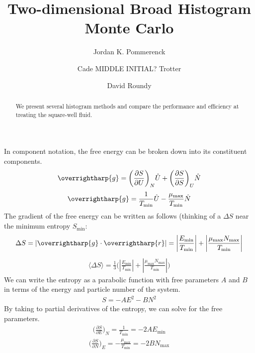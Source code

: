 \documentclass[letterpaper,twocolumn,amsmath,amssymb,pre,aps,10pt]{revtex4-1}
\newcommand\Emin{E_{\min}}
\newcommand\Nmax{N_{\max}}
\newcommand\Tmin{T_{\min}}
\newcommand\mumax{\mu_{\max}}
\begin{document}
\title{Two-dimensional Broad Histogram Monte Carlo}

\author{Jordan K. Pommerenck}
\author{Cade MIDDLE INITIAL? Trotter}
\author{David Roundy}

\begin{abstract}
We present several histogram methods and compare the performance and
efficiency at treating the square-well fluid.
\end{abstract}

\maketitle

In component notation, the free energy can be broken down into its constituent components.
\begin{align}
\overrightharp{g} = \bigg(\frac{\partial S}{\partial U}\bigg)_N \hat{U} + \bigg(\frac{\partial S}{\partial S}\bigg)_U \hat{N}
\end{align}
\begin{align}
\overrightharp{g} = \frac{1}{\Tmin} \hat{U} - \frac{\mumax}{\Tmin}  \hat{N}
\end{align}
The gradient of the free energy can be written as follows (thinking of a $\Delta S$ near the minimum entropy $S_{\min}$:
\begin{align}
\Delta S = \left|\overrightharp{g} \cdot \overrightharp{r} \right| = \left|\frac{\Emin}{\Tmin} \right| + \left|\frac{\mumax\Nmax}{\Tmin} \right|
\end{align}
\begin{align}
\langle\Delta S \rangle = \frac{1}{3}\bigg( \left|\frac{\Emin}{\Tmin} \right| + \left|\frac{\mumax\Nmax}{\Tmin} \right| \bigg)
\end{align}
We can write the entropy as a parabolic function with free parameters $A$ and $B$ in terms of the energy and particle number of the
system.
\begin{align}
S = -A E^2 - B N^2
\end{align}
By taking to partial derivatives of the entropy, we can solve for the free parameters.
\begin{align}
\bigg(\frac{\partial S}{\partial E}\bigg)_N = \frac{1}{\Tmin}
    = - 2A\Emin
\end{align}
\begin{align}
\bigg(\frac{\partial S}{\partial N}\bigg)_E = - \frac{\mumax}{\Tmin}
    = - 2B\Nmax
\end{align}
\end{document}
